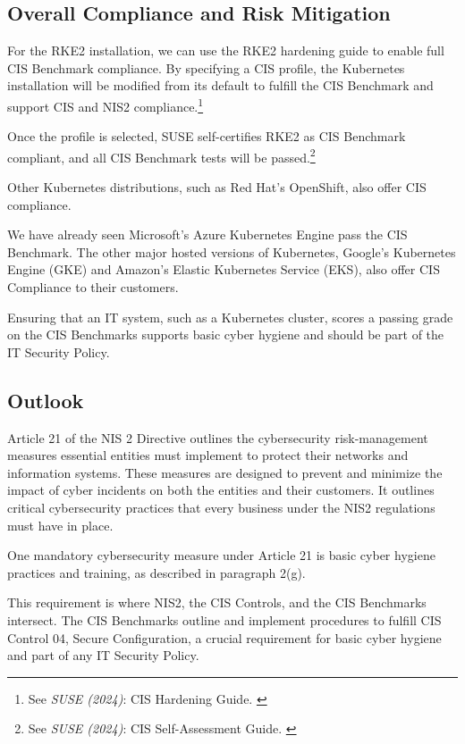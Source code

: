 \subsection{Overall Compliance and Risk Mitigation}

For the RKE2 installation, we can use the RKE2 hardening guide to enable full CIS Benchmark compliance. By specifying a CIS profile, the Kubernetes installation will be modified from its default to fulfill the CIS Benchmark and support CIS and NIS2 compliance.\footnote{See \textit{SUSE (2024)}: CIS Hardening Guide. \cite{rke2Hardening}}

Once the profile is selected, SUSE self-certifies RKE2 as CIS Benchmark compliant, and all CIS Benchmark tests will be passed.\footnote{See \textit{SUSE (2024)}: CIS Self-Assessment Guide. \cite{rke2Self}}

Other Kubernetes distributions, such as Red Hat's OpenShift, also offer CIS compliance. 

We have already seen Microsoft's Azure Kubernetes Engine pass the CIS Benchmark. The other major hosted versions of Kubernetes, Google's Kubernetes Engine (GKE) and Amazon's Elastic Kubernetes Service (EKS), also offer CIS Compliance to their customers.

Ensuring that an IT system, such as a Kubernetes cluster, scores a passing grade on the CIS Benchmarks supports basic cyber hygiene and should be part of the IT Security Policy.

\subsection{Outlook}

Article 21 of the NIS 2 Directive outlines the cybersecurity risk-management measures essential entities must implement to protect their networks and information systems. These measures are designed to prevent and minimize the impact of cyber incidents on both the entities and their customers. It outlines critical cybersecurity practices that every business under the NIS2 regulations must have in place. 

One mandatory cybersecurity measure under Article 21 is basic cyber hygiene practices and training, as described in paragraph 2(g).

This requirement is where NIS2, the CIS Controls, and the CIS Benchmarks intersect. The CIS Benchmarks outline and implement procedures to fulfill CIS Control 04, Secure Configuration, a crucial requirement for basic cyber hygiene and part of any IT Security Policy.

